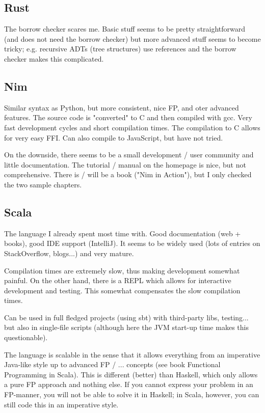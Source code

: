 \subsection{Rust}

The borrow checker scares me. Basic stuff seems to be pretty straightforward (and does not need the borrow checker) but more advanced stuff seems to become tricky; e.g. recursive ADTs (tree structures) use references and the borrow checker makes this complicated.

\subsection{Nim}

Similar syntax as Python, but more consistent, nice FP, and oter advanced features. The source code is "converted" to C and then compiled with gcc. Very fast development cycles and short compilation times. The compilation to C allows for very easy FFI. Can also compile to JavaScript, but have not tried.

On the downside, there seems to be a small development / user community and little documentation. The tutorial / manual on the homepage is nice, but not comprehensive. There is / will be a book ("Nim in Action"), but I only checked the two sample chapters.

\subsection{Scala}

The language I already spent most time with. Good documentation (web + books), good IDE support (IntelliJ). It seems to be widely used (lots of entries on StackOverflow, blogs...) and very mature.

Compilation times are extremely slow, thus making development somewhat painful. On the other hand, there is a REPL which allows for interactive development and testing. This somewhat compensates the slow compilation times.

Can be used in full fledged projects (using sbt) with third-party libs, testing... but also in single-file scripts (although here the JVM start-up time makes this questionable).

The language is scalable in the sense that it allows everything from an imperative Java-like style up to advanced FP / ... concepts (see book Functional Programming in Scala). This is different (better) than Haskell, which only allows a pure FP approach and nothing else. If you cannot express your problem in an FP-manner, you will not be able to solve it in Haskell; in Scala, however, you can still code this in an imperative style.

